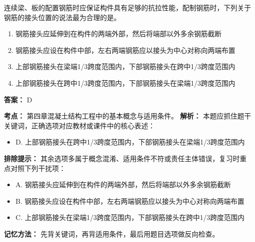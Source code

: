 \documentclass[UTF8,fontset=fandol,11pt]{ctexart}
\begin{document}
\vspace{0.2em}

\begin{quizbox}[title={第 28 题}]
连续梁、板的配置钢筋时应保证构件具有足够的抗拉性能，配制钢筋时，下列关于钢筋的接头位置的说法最为合理的是。\\
\begin{enumerate}[label=\Alph*.]
\item 钢筋接头应延伸到在构件的两端外部，然后将端部以外多余钢筋截断
\item 钢筋接头应设在构件中部，左右两端钢筋应以接头为中心对称向两端布置
\item 上部钢筋接头在梁端1/3跨度范围内，下部钢筋接头在跨中1/3跨度范围内
\item 上部钢筋接头在跨中1/3跨度范围内，下部钢筋接头在梁端1/3跨度范围内
\end{enumerate}
\textbf{答案：} D
\vspace{0.25em}
\begin{answerbox}[title={考点解析}]
\textbf{考点：} 第四章混凝土结构工程中的基本概念与适用条件。
\textbf{解析：} 本题应抓住题干关键词，正确选项对应教材或课件中的核心表述：
\begin{itemize}
\item D. 上部钢筋接头在跨中1/3跨度范围内，下部钢筋接头在梁端1/3跨度范围内
\end{itemize}
\textbf{排除提示：} 其余选项多属于概念混淆、适用条件不符或责任主体错误，复习时重点对照下列干扰项：
\begin{itemize}
\item A. 钢筋接头应延伸到在构件的两端外部，然后将端部以外多余钢筋截断
\item B. 钢筋接头应设在构件中部，左右两端钢筋应以接头为中心对称向两端布置
\item C. 上部钢筋接头在梁端1/3跨度范围内，下部钢筋接头在跨中1/3跨度范围内
\end{itemize}
\textbf{记忆方法：} 先背关键词，再背适用条件，最后用题目选项做反向检查。
\end{answerbox}
\end{quizbox}

\vspace{0.2em}
\end{document}
